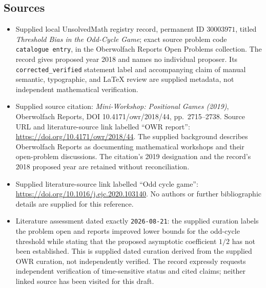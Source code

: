 \documentclass[11pt]{article}
\begin{document}
\subsection{Sources}
\begin{itemize}
\item Supplied local UnsolvedMath registry record, permanent ID \(30003971\), titled \emph{Threshold Bias in the Odd-Cycle Game}; exact source problem code \texttt{catalogue entry}, in the Oberwolfach Reports Open Problems collection. The record gives proposed year 2018 and names no individual proposer. Its \texttt{corrected\_verified} statement label and accompanying claim of manual semantic, typographic, and LaTeX review are supplied metadata, not independent mathematical verification.
\item Supplied source citation: \emph{Mini-Workshop: Positional Games (2019)}, Oberwolfach Reports, DOI 10.4171/owr/2018/44, pp.\ 2715--2738. Source URL and literature-source link labelled ``OWR report'': \url{https://doi.org/10.4171/owr/2018/44}. The supplied background describes Oberwolfach Reports as documenting mathematical workshops and their open-problem discussions. The citation's 2019 designation and the record's 2018 proposed year are retained without reconciliation.
\item Supplied literature-source link labelled ``Odd cycle game'': \url{https://doi.org/10.1016/j.ejc.2020.103140}. No authors or further bibliographic details are supplied for this reference.
\item Literature assessment dated exactly \texttt{2026-08-21}: the supplied curation labels the problem open and reports improved lower bounds for the odd-cycle threshold while stating that the proposed asymptotic coefficient \(1/2\) has not been established. This is supplied dated curation derived from the supplied OWR curation, not independently verified. The record expressly requests independent verification of time-sensitive status and cited claims; neither linked source has been visited for this draft.
\end{itemize}
\end{document}
